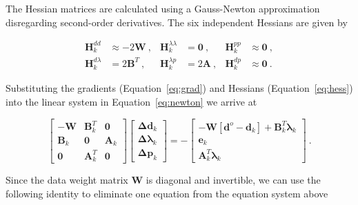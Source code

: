The Hessian matrices are calculated using a Gauss-Newton approximation
disregarding second-order derivatives. The six independent Hessians are given
by

\begin{equation}
  \begin{aligned}
    \mathbf{H}^{dd}_k &\approx -2\mathbf{W} \ , &
    \mathbf{H}^{\lambda\lambda}_k &= \mathbf{0} \ , &
    \mathbf{H}^{pp}_k &\approx \mathbf{0} \ ,
    \\
    \mathbf{H}^{d\lambda}_k &= 2\mathbf{B}^T \ , &
    \mathbf{H}^{\lambda p}_k &= 2\mathbf{A} \ , &
    \mathbf{H}^{dp}_k &\approx \mathbf{0} \ .
  \end{aligned}
  \label{eq:hess}
\end{equation}

\noindent
Substituting the gradients (Equation~\ref{eq:grad}) and Hessians
(Equation~\ref{eq:hess}) into the linear system in Equation~\ref{eq:newton} we
arrive at

\begin{equation}
    \begin{bmatrix}
      -\mathbf{W} & \mathbf{B}_k^T & \mathbf{0} \\
      \mathbf{B}_k & \mathbf{0} & \mathbf{A}_k \\
      \mathbf{0} & \mathbf{A}_k^T & \mathbf{0}
    \end{bmatrix}
  \begin{bmatrix}
    \mathbf{\Delta d}_k \\
    \mathbf{\Delta \lambda}_k \\
    \mathbf{\Delta p}_k
  \end{bmatrix}
  = -
    \begin{bmatrix}
      -\mathbf{W}\left[\mathbf{d}^o - \mathbf{d}_k\right] + \mathbf{B}_k^T\mathbf{\lambda}_k
      \\
      \mathbf{e}_k
      \\
      \mathbf{A}_k^T\mathbf{\lambda}_k
    \end{bmatrix}
  \ .
  \label{eq:normal}
\end{equation}

Since the data weight matrix $\mathbf{W}$ is diagonal and invertible, we can
use the following identity to eliminate one equation from the equation system
above

